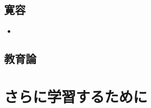 \documentclass[uplatex,dvipdfmx]{jsarticle} \usepackage{mystyle}%
\begin{document}
\subsection{寛容}

\begin{itemize}
\item 
\end{itemize}

\subsection{教育論}







 \nocite{中公67:デカルト}
 \nocite{山岡龍一95:ロック}
 \nocite{田中浩98:ホッブズ}
 \nocite{浜林正夫96:ロック}
 \nocite{太田義器95:グロティウス}


\section{さらに学習するために}



\ifx\mybook\undefined


\end{document}
